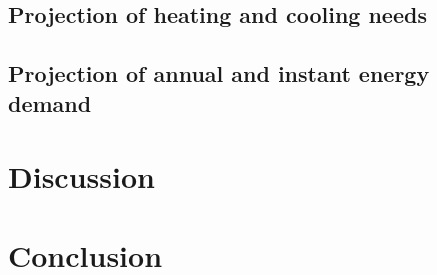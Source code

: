 \documentclass[11pt]{article}
\begin{document}
    \subsection{Projection of heating and cooling needs} %
    \label{sub:evolution_des_besoins_énergétiques}
    

    \subsection{Projection of annual and instant energy demand} %
    \label{sub:évoltuion_des_consommations}
    

\section{Discussion}
\label{sec:disc}

\section{Conclusion}
\label{sec:conclu}



\clearpage
\printbibliography
\end{document}
